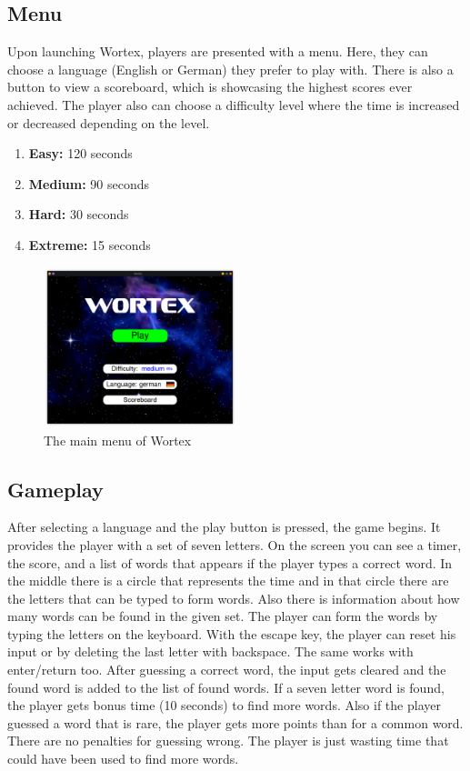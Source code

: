 \documentclass{article}[12pt]
\begin{document}
    \subsection*{Menu}

    Upon launching Wortex, players are presented with a menu. Here, they can
    choose a language (English or German) they prefer to play with. There is also
    a button to view a scoreboard, which is showcasing the highest scores ever
    achieved. The player also can choose a difficulty level where the time is 
    increased or decreased depending on the level.
    \newpage
    \begin{enumerate}
        \item \textbf{Easy:} 120 seconds
        \item \textbf{Medium:} 90 seconds
        \item \textbf{Hard:} 30 seconds
        \item \textbf{Extreme:} 15 seconds
    \end{enumerate}

    \begin{figure}[ht]
        \centering
        \includegraphics[width=0.5\textwidth]{pictures/menu.png}
        \caption{The main menu of Wortex}
    \end{figure}


    \subsection*{Gameplay}

    After selecting a language and the play button is pressed, the game begins.
    It provides the player with a set of seven letters. On the screen you can
    see a timer, the score, and a list of words that appears if the player
    types a correct word. In the middle there is a circle that represents the
    time and in that circle there are the letters that can be typed to form
    words. Also there is information about how many words can be found in the
    given set. The player can form the words by typing the letters on the
    keyboard. With the escape key, the player can reset his input or by
    deleting the last letter with backspace. The same works with enter\slash return too.
    After guessing a correct word, the input gets cleared and the found word is
    added to the list of found words. If a seven letter word is found, the
    player gets bonus time (10 seconds) to find more words. Also if the player
    guessed a word that is rare, the player gets more points than for a common
    word. There are no penalties for guessing wrong. The player is just wasting
    time that could have been used to find more words. 
\end{document}
